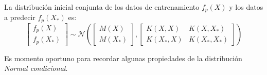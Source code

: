 La distribución inicial conjunta de los datos de entrenamiento $f_p(X)$ y los datos a predecir $f_p(X_*)$ es: 
\begin{equation*}
    \left[
        \begin{array}{c}
        f_p(X)  \\
        f_p(X_*) 
        \end{array}
    \right]  
    \sim \mathcal{N}  
    \left(
        \left[
            \begin{array}{c} 
            M(X) \\ 
            M(X_*) 
            \end{array}
        \right],
        \left[
            \begin{array}{cc}
            K(X,X) & K(X,X_*)  \\
            K(X_*,X) & K(X_*,X_*) 
            \end{array}
        \right]
    \right) 
\end{equation*}

Es momento oportuno para recordar algunas propiedades de la distribuci\'on \textit{Normal condicional}. 

\newtheorem{prop}{Propiedad}

